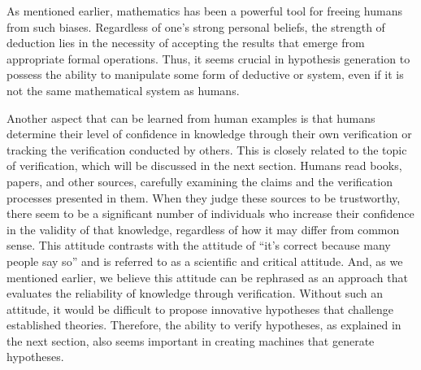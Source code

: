 
As mentioned earlier, mathematics has been a powerful tool for freeing humans from such biases. Regardless of one's strong personal beliefs, the strength of deduction lies in the necessity of accepting the results that emerge from appropriate formal operations. Thus, it seems crucial in hypothesis generation to possess the ability to manipulate some form of deductive or system, even if it is not the same mathematical system as humans.

Another aspect that can be learned from human examples is that humans determine their level of confidence in knowledge through their own verification or tracking the verification conducted by others. This is closely related to the topic of verification, which will be discussed in the next section. Humans read books, papers, and other sources, carefully examining the claims and the verification processes presented in them. When they judge these sources to be trustworthy, there seem to be a significant number of individuals who increase their confidence in the validity of that knowledge, regardless of how it may differ from common sense. This attitude contrasts with the attitude of ``it's correct because many people say so'' and is referred to as a scientific and critical attitude. And, as we mentioned earlier, we believe this attitude can be rephrased as an approach that evaluates the reliability of knowledge through verification. Without such an attitude, it would be difficult to propose innovative hypotheses that challenge established theories. Therefore, the ability to verify hypotheses, as explained in the next section, also seems important in creating machines that generate hypotheses.


